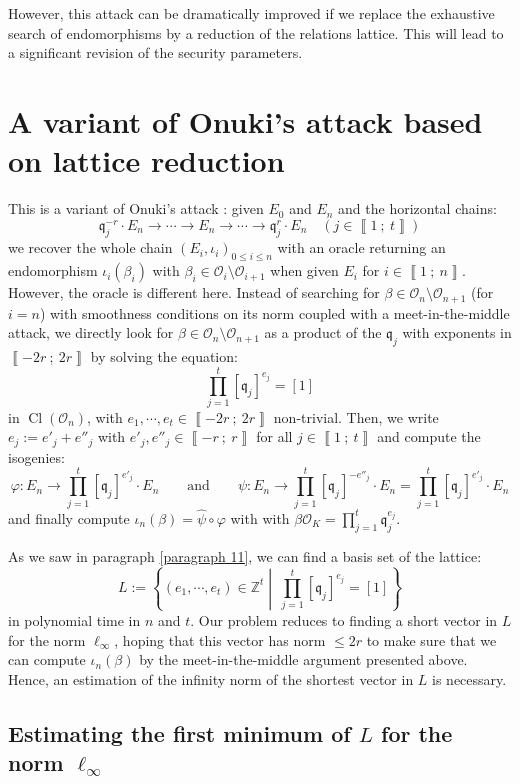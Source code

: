 \documentclass[a4paper,10pt]{report}
\theoremstyle{definition}
\theoremstyle{plain}
\theoremstyle{definition}
\newcommand{\Z}{\mathbb{Z}}
\newcommand{\mO}{\mathcal{O}}
\renewcommand{\i}[2]{\left\llbracket #1~;~#2\right\rrbracket}
\renewcommand{\(}{\left(}
\renewcommand{\)}{\right)}
\newcommand{\mf}[1]{\mathfrak{#1}}
\DeclareMathOperator{\Cl}{Cl}
\begin{document}
However, this attack can be dramatically improved if we replace the exhaustive search of endomorphisms by a reduction of the relations lattice. This will lead to a significant revision of the security parameters.

\section{A variant of Onuki's attack based on lattice reduction}\label{paragraph 9}

This is a variant of Onuki's attack : given $E_0$ and $E_n$ and the horizontal chains:
\[\mf{q}_j^{-r}\cdot E_n\longrightarrow \cdots \longrightarrow E_n\longrightarrow \cdots\longrightarrow \mf{q}_j^{r}\cdot E_n \quad (j\in\i{1}{t})\]
we recover the whole chain $(E_i,\iota_i)_{0\leq i\leq n}$ with an oracle returning an endomorphism $\iota_i(\beta_i)$ with $\beta_i\in\mO_i\setminus\mO_{i+1}$ when given $E_i$ for $i\in\i{1}{n}$. However, the oracle is different here.  Instead of searching for $\beta\in\mO_n\setminus\mO_{n+1}$ (for $i=n$) with smoothness conditions on its norm coupled with a meet-in-the-middle attack, we directly look for $\beta\in\mO_n\setminus\mO_{n+1}$ as a product of the $\mf{q}_j$ with exponents in $\i{-2r}{2r}$ by solving the equation:
\[\prod_{j=1}^t[\mf{q}_j]^{e_j}=[1]\]
in $\Cl(\mO_n)$, with $e_1,\cdots, e_t\in\i{-2r}{2r}$ non-trivial.  Then, we write $e_j:=e'_j+e''_j$ with $e'_j,e''_j\in\i{-r}{r}$ for all $j\in\i{1}{t}$ and compute the isogenies:
\[\varphi : E_n \longrightarrow \prod_{j=1}^t[\mf{q}_j]^{e'_j}\cdot E_n \qquad \mbox{and} \qquad \psi : E_n  \longrightarrow  \prod_{j=1}^t[\mf{q}_j]^{-e''_j}\cdot E_n=\prod_{j=1}^t[\mf{q}_j]^{e'_j}\cdot E_n\]
and finally compute $\iota_n(\beta)=\hat{\psi}\circ\varphi$ with with $\beta\mO_K= \prod_{j=1}^t\mf{q}_j^{e_j}$.

As we saw in paragraph \ref{paragraph 11}, we can find a basis set of the lattice:
\[L:=\left\{(e_1,\cdots,e_t)\in\Z^t\middle| \  \prod_{j=1}^t[\mf{q}_j]^{e_j}=[1]\right\}\]
in polynomial time in $n$ and $t$.  Our problem reduces to finding a short vector in $L$ for the norm $\ell_\infty$, hoping that this vector has norm $\leq 2r$ to make sure that we can compute $\iota_n(\beta)$ by the meet-in-the-middle argument presented above.  Hence,  an estimation of the infinity norm of the shortest vector in $L$ is necessary.

\subsection{Estimating the first minimum of $L$ for the norm $\ell_\infty$}
\end{document}
